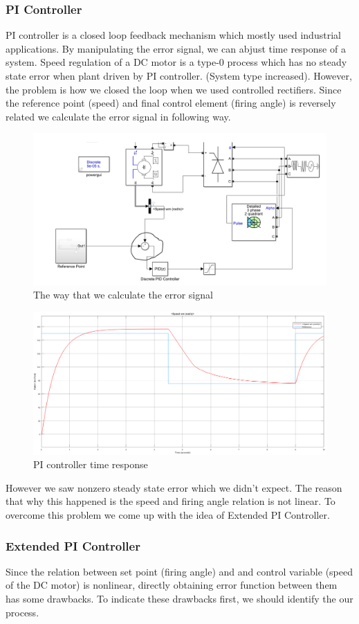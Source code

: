 \documentclass[fleqn, a4paper]{report}
\begin{document}
\subsubsection*{PI Controller}
PI controller is a closed loop feedback mechanism which mostly used industrial applications. By manipulating the error signal, we can abjust time response of a system.
Speed regulation of a DC motor is a type-0 process which has no steady state error when plant driven by PI controller. (System type increased). 
However, the problem is how we closed the loop when we used controlled rectifiers. Since the reference point (speed) and final control element (firing angle) is reversely related we calculate the error signal in following way.   
\begin{figure}[H]
    \centering
    \includegraphics[width=10 cm]{pi_error_signal}
    \caption{The way that we calculate the error signal}
    \label{fig:my_label}
\end{figure}
\begin{figure}[H]
    \centering
    \includegraphics[width=10 cm]{pi_controller_no_extended.png}
    \caption{PI controller time response}
    \label{fig:my_label}
\end{figure}
However we saw nonzero steady state error which we didn't expect. The reason that why this happened is the speed and firing angle relation is not linear. To overcome this problem we come up with the idea of Extended PI Controller.
\subsubsection*{Extended PI Controller}
Since the relation between set point (firing angle) and and control variable (speed of the DC motor) is nonlinear, directly obtaining error function between them has some drawbacks. To indicate these drawbacks first, we should identify the our process. 
\end{document}
